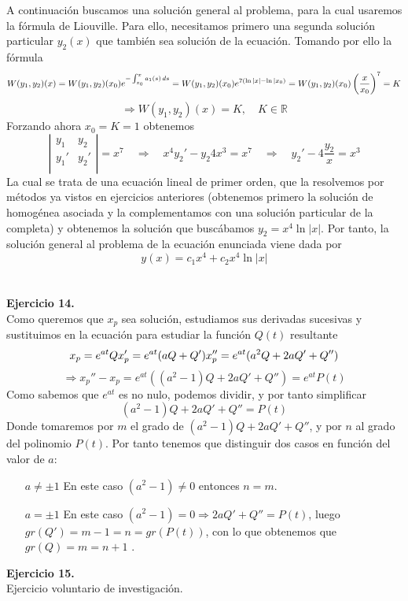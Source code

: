 \documentclass[fleqn]{article}
\def\R{\mathds{R}}
\def\next{\quad \Rightarrow \quad}
\begin{document}
    A continuación buscamos una solución general al problema, para la cual usaremos la fórmula de Liouville. Para ello, necesitamos primero una segunda
    solución particular $y_2(x)$ que también sea solución de la ecuación. Tomando por ello la fórmula
    $$W(y_1,y_2)(x) = W(y_1,y_2)(x_0) e^{-\int_{x_0}^x a_1(s)\thinspace ds} = W(y_1,y_2)(x_0) e^{7(\ln|x|-\ln|x_0)} = W(y_1,y_2)(x_0) \left(\frac{x}{x_0}\right)^7= K$$
    $$\Rightarrow W(y_1,y_2)(x) = K,\quad K\in \R$$
    Forzando ahora $x_0=K=1$ obtenemos
    $$
        \left|
        \begin{matrix}
            y_1 & y_2\\
            y_1' & y_2'\\
        \end{matrix}
        \right|=x^7 \next
        x^4y_2' - y_2 4x^3 = x^7 \next y_2' - 4\frac{y_2}{x} = x^3      
    $$
    La cual se trata de una ecuación lineal de primer orden, que la resolvemos por métodos ya vistos en ejercicios anteriores (obtenemos primero la
    solución de homogénea asociada y la complementamos con una solución particular de la completa) y obtenemos la solución que buscábamos $y_2=x^4\ln|x|$.
    Por tanto, la solución general al problema de la ecuación enunciada viene dada por 
    $$y(x)=c_1x^4 + c_2x^4\ln|x|$$\\ \\

    \textbf{Ejercicio 14.}\\

    Como queremos que $x_p$ sea solución, estudiamos sus derivadas sucesivas y sustituimos en la ecuación para estudiar la función $Q(t)$ resultante
    \begin{equation*}
        x_p=e^{at}Q\\
        x'_p=e^{at}(aQ+Q')\\
        x''_p=e^{at}(a^2Q+2aQ'+Q'')\\       
    \end{equation*} 
    $$\Rightarrow x_p''-x_p=e^{at}((a^2-1)Q+2aQ'+Q'')=e^{at}P(t)$$
    Como sabemos que $e^{at}$ es no nulo, podemos dividir, y por tanto simplificar
    $$(a^2-1)Q+2aQ'+Q''=P(t)$$
    Donde tomaremos por $m$ el grado de $(a^2-1)Q+2aQ'+Q''$, y por $n$ al grado del polinomio $P(t)$. Por tanto tenemos que distinguir dos casos en función
    del valor de $a$:
    \begin{itemize}
        \item[$a\neq \pm 1$] En este caso $(a^2-1)\neq 0$ entonces $n=m$.
        \item[$a = \pm 1$] En este caso $(a^2-1) = 0 \Rightarrow 2aQ' + Q'' = P(t)$, luego $gr(Q')=m-1=n=gr(P(t))$, con lo que obtenemos que 
                $gr(Q)=m=n+1$ .
    \end{itemize}

    \textbf{Ejercicio 15.} \\

    Ejercicio voluntario de investigación. 
\end{document}

